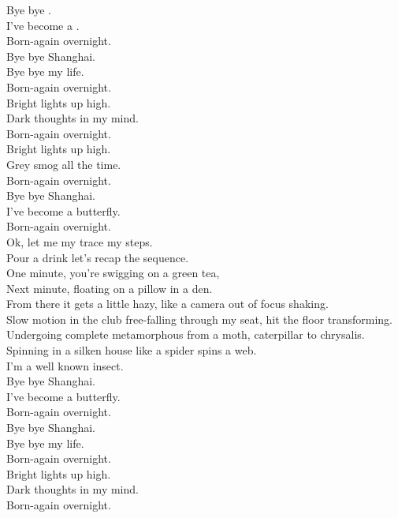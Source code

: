 


Bye bye . \\
I've become a . \\
Born-again overnight. \\
Bye bye Shanghai. \\
Bye bye my life. \\
Born-again overnight. \\
Bright lights up high. \\
Dark thoughts in my mind. \\
Born-again overnight. \\
Bright lights up high. \\
Grey smog all the time. \\
Born-again overnight. \\
Bye bye Shanghai. \\
I've become a butterfly. \\
Born-again overnight. \\

Ok, let me my trace my steps. \\
Pour a drink let's recap the sequence. \\
One minute, you're swigging on a green tea, \\
Next minute, floating on a pillow in a den. \\
From there it gets a little hazy, like a camera out of focus shaking. \\
Slow motion in the club free-falling through my seat, hit the floor transforming. \\
Undergoing complete metamorphous from a moth, caterpillar to chrysalis. \\
Spinning in a silken house like a spider spins a web. \\
I'm a well known insect. \\

Bye bye Shanghai. \\
I've become a butterfly. \\
Born-again overnight. \\
Bye bye Shanghai. \\
Bye bye my life. \\
Born-again overnight. \\
Bright lights up high. \\
Dark thoughts in my mind. \\
Born-again overnight. \\

